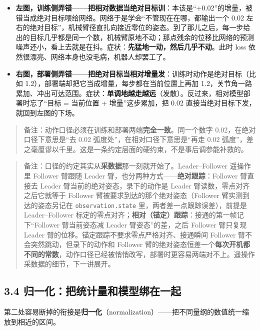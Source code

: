 \documentclass[
  chinese,
]{ctexart}
\providecommand{\tightlist}{%
  \setlength{\itemsep}{0pt}\setlength{\parskip}{0pt}}
\begin{document}
\begin{itemize}
\tightlist
\item
  \textbf{左图，训练侧弄错------把相对数据当绝对目标训}：本该是``+0.02''的增量，被错当成绝对目标喂给网络。网络于是学会``不管现在在哪，都输出一个
  0.02
  左右的绝对目标''，机械臂径直扎向接近零位的姿态。到了那儿之后，每一步给出的目标几乎都是同一个数，机械臂原地不动；那点残余的位移比网络的预测噪声还小，看上去就是在抖。症状：\textbf{先猛地一动，然后几乎不动}。此时
  loss 依然很漂亮、网络本身也没毛病，机器人却罢工了。
\item
  \textbf{右图，部署侧弄错------把绝对目标当相对增量发}：训练时动作是绝对目标（比如
  1.2），部署端却把它当成增量，每步都在当前位置上再加
  1.2，关节角一路累加、冲出可达范围。症状：\textbf{单调地越走越远}（发散）。反过来，相对模型部署时忘了``目标
  = 当前位置 + 增量''这步累加，把 0.02
  直接当绝对目标下发，就回到左图的下场。
\end{itemize}

\begin{quote}
备注：动作口径必须在训练和部署两端\textbf{完全一致}。同一个数字
0.02，在绝对口径下意思是``去 0.02 弧度处''，在相对口径下意思是``再走
0.02
弧度''，差之毫厘谬以千里。这是一条约定层面的硬约束，不是事后调参能补救的。
\end{quote}

\begin{quote}
备注：口径的约定其实从\textbf{采数据}那一刻就开始了。Leader--Follower
遥操作里 Follower 臂跟随 Leader
臂，也分两种方式------\textbf{绝对跟踪}：Follower 臂直接去 Leader
臂当前的绝对姿态，录下的动作是 Leader 臂读数，零点对齐之后它就等于
Follower 臂被要求到达的那个绝对姿态（Follower 臂实测到达的姿态另记在
\texttt{observation.state} 里，两者差一点跟踪误差），前提是
Leader--Follower
标定的零点对齐；\textbf{相对（锚定）跟踪}：接通的第一帧记下``Follower
臂当前姿态减 Leader 臂姿态''的差，之后 Follower 臂只复现 Leader
臂的位移。锚定跟踪不要求零点严格对齐、接通瞬间 Follower
臂不会突然跳动，但录下的动作和 Follower
臂的绝对姿态恒差一个\textbf{每次开机都不同的常数}，动作口径已经被悄悄改写，部署时更容易两端对不上。遥操作采数据的细节，下一讲展开。
\end{quote}

\subsection{3.4
归一化：把统计量和模型绑在一起}\label{ux5f52ux4e00ux5316ux628aux7edfux8ba1ux91cfux548cux6a21ux578bux7ed1ux5728ux4e00ux8d77}

第二处容易断掉的衔接是\textbf{归一化}（normalization）------把不同量纲的数值统一缩放到相近的区间。
\end{document}
